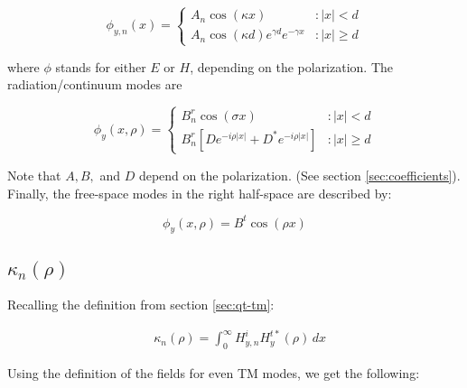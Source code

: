 \documentclass[11pt, oneside]{article}   	%
\begin{document}
\[\phi_{y,n}(x) = \left\{
  \begin{array}{lr}
    A_{n}\cos(\kappa x) & : |x| < d\\
    A_{n}\cos(\kappa d)e^{\gamma d}e^{-\gamma x} & : |x| \ge d
  \end{array}
\right.
\]

\noindent where $\phi$ stands for either $E$ or $H$, depending on the polarization. The radiation/continuum modes are

\[\phi_{y}(x, \rho) = \left\{
  \begin{array}{lr}
    B_{n}^{r}\cos(\sigma x) & : |x| < d\\
    B_{n}^{r}\left[De^{-i\rho |x|} + D^{*}e^{-i\rho |x|}\right] & : |x| \ge d
  \end{array}
\right.
\]

\noindent Note that $A, B,$ and $D$ depend on the polarization. (See section \ref{sec:coefficients}).  Finally, the free-space modes in the right half-space are described by:

\[\phi_{y}(x,\rho) = B^{t}\cos(\rho x)\]

\subsection{$\kappa_{n}(\rho)$}

Recalling the definition from section \ref{sec:qt-tm}:

\begin{align}
&\kappa_{n}(\rho) = \int_{0}^{\infty} H_{y,n}^{i} H_{y}^{t*}(\rho) \, dx \nonumber
\end{align}

\noindent Using the definition of the fields for even TM modes, we get the following:
\end{document}
